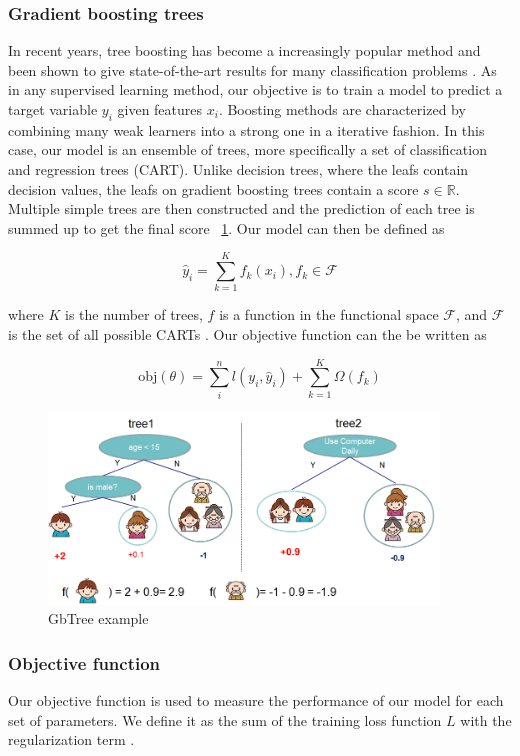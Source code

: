 \documentclass[cic,tc,english]{iiufrgs}
\begin{document}
\subsubsection{Gradient boosting trees}
In recent years, tree boosting has become a increasingly popular method and been shown to give state-of-the-art results for many classification problems \cite{Li2012}. As in any supervised learning method, our objective is to train a model to predict a target variable \(y_i\) given features \(x_i\). Boosting methods are characterized by combining many weak learners into a strong one in a iterative fashion. In this case, our model is an ensemble of trees, more specifically a set of classification and regression trees (CART). Unlike decision trees, where the leafs contain decision values, the leafs on gradient boosting trees contain a score \(s \in \mathbb{R}\). Multiple simple trees are then constructed and the prediction of each tree is summed up to get the final score ~\ref{fig:ex1}. Our model can then be defined as

$$\hat{y}_i = \sum_{k=1}^K f_k(x_i), f_k \in \mathcal{F}$$

where \(K\) is the number of trees, \(f\) is a function in the functional space $\mathcal{F}$, and $\mathcal{F}$ is the set of all possible CARTs \cite{Chen2016}. Our objective function can the be written as

$$\text{obj}(\theta) = \sum_i^n l(y_i, \hat{y}_i) + \sum_{k=1}^K \Omega(f_k)$$

\begin{figure}
    \caption{GbTree example}
    \begin{center}
        \includegraphics[width=28em]{twocart}
    \end{center}
    \label{fig:ex1}
\end{figure}

\subsubsection{Objective function}
Our objective function is used to measure the performance of our model for each set of parameters. We define it as the sum of the training loss function \(L\) with the regularization term \Omega.
\end{document}
